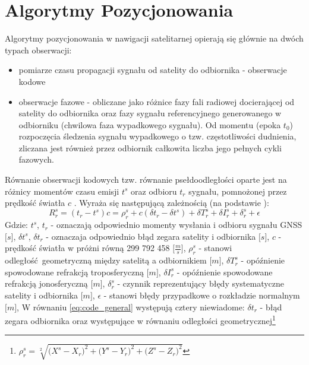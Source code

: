 \section{Algorytmy Pozycjonowania}
Algorytmy pozycjonowania w nawigacji satelitarnej opierają się głównie na dwóch typach obserwacji: 
\begin{itemize}
	\item pomiarze czasu propagacji sygnału od satelity do odbiornika - obserwacje kodowe
	\item obserwacje fazowe - obliczane jako różnice fazy fali radiowej docierającej od satelity do odbiornika oraz fazy sygnału referencyjnego 
	generowanego w odbiorniku (chwilowa faza wypadkowego sygnału). Od momentu (epoka $t_0$) rozpoczęcia śledzenia sygnału wypadkowego o tzw. częstotliwości dudnienia,
	zliczana jest również przez odbiornik całkowita liczba jego pełnych cykli fazowych.
\end{itemize}
\indent Równanie obserwacji kodowych tzw. równanie psełdoodległości oparte jest na różnicy momentów czasu emisji $t^s$ oraz odbioru $t_r$ sygnału, pomnożonej 
przez prędkość światła $c$ \cite[][strona 11]{BOSY_2005}. Wyraża się następującą zależnością (na podstawie \cite[]{BOSY_2005}):
\begin{equation}
	R_r^s = (t_r - t^s)c = \rho_r^s + c({\delta}t_r - {\delta}t^s) + {\delta}T_r^s + {\delta}I_r^s + {\delta}_r^s + \epsilon
	\label{eq:code_general}
\end{equation}
Gdzie:
$t^s$, $t_r$ - oznaczają odpowiednio momenty wysłania i odbioru sygnału GNSS $\big[s\big]$,\newline
${\delta}t^s$, ${\delta}t_r$ - oznaczaja odpowiednio błąd zegara satelity i odbiornika $\big[s\big]$,\newline
$c$ - prędkość światła w próżni równą 299 792 458 $\big[\frac{m}{s}\big]$,\newline
$\rho_r^s$ - stanowi odległość geometryczną między satelitą a odbiornikiem $\big[m\big]$,\newline
${\delta}T_r^s$ - opóźnienie spowodowane refrakcją troposferyczną $\big[m\big]$,\newline
${\delta}I_r^s$ - opóźnienie spowodowane refrakcją jonosferyczną $\big[m\big]$,\newline
${\delta}_r^s$ - czynnik reprezentujący błędy systematyczne satelity i odbiornika $\big[m\big]$,\newline
$\epsilon$ - stanowi błędy przypadkowe o rozkładzie normalnym $\big[m\big]$,\newline
W równaniu \ref{eq:code_general} występują cztery niewiadome: ${\delta}t_r$ - błąd zegara odbiornika oraz występujące w równaniu odległości geometrycznej\footnote{
${\rho}_r^s = \sqrt[2]{{\big(X^s - X_r\big)}^2 + {\big(Y^s - Y_r\big)}^2 + {\big(Z^s - Z_r\big)}^2}$}
